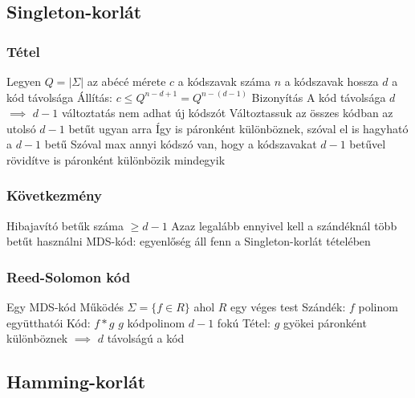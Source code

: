 \documentclass[12pt,a4paper]{article}
\begin{document}
\pagebreak

\subsection{Singleton-korlát}

\subsubsection{Tétel}

\begin{outline}
	\1 Legyen
		\2 $Q=|\Sigma|$ az abécé mérete
		\2 $c$ a kódszavak száma
		\2 $n$ a kódszavak hossza
		\2 $d$ a kód távolsága
	\1 Állítás: $c \le Q^{n-d+1} = Q^{n-(d-1)}$
	\1 Bizonyítás
		\2 A kód távolsága $d$ $\implies$ $d-1$ változtatás nem adhat új kódszót
		\2 Változtassuk az összes kódban az utolsó $d-1$ betűt ugyan arra
		\2 Így is páronként különböznek, szóval el is hagyható a $d-1$ betű
		\2 Szóval max annyi kódszó van, hogy a kódszavakat $d-1$ betűvel rövidítve is páronként különbözik mindegyik
\end{outline}

\subsubsection{Következmény}

\begin{outline}
	\1 Hibajavító betűk száma $\ge d-1$
		\2 Azaz legalább ennyivel kell a szándéknál több betűt használni
	\1 MDS-kód: egyenlőség áll fenn a Singleton-korlát tételében
\end{outline}

\subsubsection{Reed-Solomon kód}

\begin{outline}
	\1 Egy MDS-kód
	\1 Működés
		\2 $\Sigma=\{f\in R\}$ ahol $R$ egy véges test
		\2 Szándék: $f$ polinom együtthatói
		\2 Kód: $f*g$
		\2 $g$ kódpolinom $d-1$ fokú
	\1 Tétel: $g$ gyökei páronként különböznek $\implies$ $d$ távolságú a kód
\end{outline}

\pagebreak

\subsection{Hamming-korlát}
\end{document}
